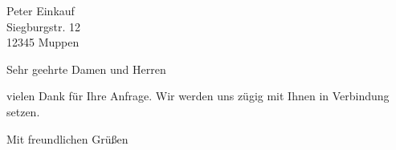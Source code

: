 \documentclass[ppsletter,fontsize=11pt]{scrlttr2}
\begin{document}


\begin{letter}{%
	Peter Einkauf\\
	Siegburgstr. 12\\
	12345 Muppen\\
}
\opening{Sehr geehrte Damen und Herren}

vielen Dank für Ihre Anfrage. Wir werden uns zügig mit Ihnen in Verbindung setzen.


\closing{Mit freundlichen Grüßen}
\end{letter}
\end{document}
